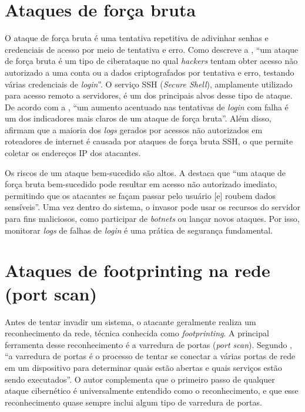 \documentclass[
    12pt
    ,oneside
    ,a4paper
    ,chapter=TITLE
    ,section=TITLE
    ,sumario=abnt-6027-2012]{abntex2}
\begin{document}
\section{Ataques de força bruta}

O ataque de força bruta é uma tentativa repetitiva de adivinhar senhas e credenciais de acesso por meio de tentativa e erro. Como descreve a , “um ataque de força bruta é um tipo de ciberataque no qual \textit{hackers} tentam obter acesso não autorizado a uma conta ou a dados criptografados por tentativa e erro, testando várias credenciais de \textit{login}”. O serviço SSH (\textit{Secure Shell}), amplamente utilizado para acesso remoto a servidores, é um dos principais alvos desse tipo de ataque. De acordo com a , “um aumento acentuado nas tentativas de \textit{login} com falha é um dos indicadores mais claros de um ataque de força bruta”. Além disso,  afirmam que a maioria dos \textit{logs} gerados por acessos não autorizados em roteadores de internet é causada por ataques de força bruta SSH, o que permite coletar os endereços IP dos atacantes.

Os riscos de um ataque bem-sucedido são altos. A  destaca que “um ataque de força bruta bem-sucedido pode resultar em acesso não autorizado imediato, permitindo que os atacantes se façam passar pelo usuário [e] roubem dados sensíveis”. Uma vez dentro do sistema, o invasor pode usar os recursos do servidor para fins maliciosos, como participar de \textit{botnets} ou lançar novos ataques. Por isso, monitorar \textit{logs} de falhas de \textit{login} é uma prática de segurança fundamental.

\section{Ataques de footprinting na rede (port scan)}

Antes de tentar invadir um sistema, o atacante geralmente realiza um reconhecimento da rede, técnica conhecida como \textit{footprinting}. A principal ferramenta desse reconhecimento é a varredura de portas (\textit{port scan}). Segundo , “a varredura de portas é o processo de tentar se conectar a várias portas de rede em um dispositivo para determinar quais estão abertas e quais serviços estão sendo executados”. O autor complementa que o primeiro passo de qualquer ataque cibernético é universalmente entendido como o reconhecimento, e que esse reconhecimento quase sempre inclui algum tipo de varredura de portas.
\end{document}
